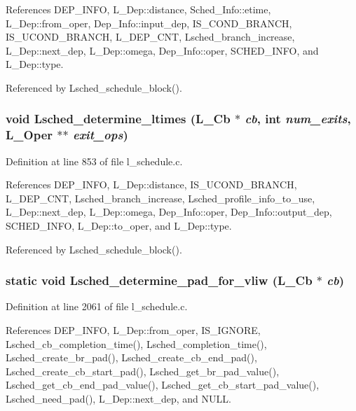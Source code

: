 References DEP\_\-INFO, L\_\-Dep::distance, Sched\_\-Info::etime, L\_\-Dep::from\_\-oper, Dep\_\-Info::input\_\-dep, IS\_\-COND\_\-BRANCH, IS\_\-UCOND\_\-BRANCH, L\_\-DEP\_\-CNT, Lsched\_\-branch\_\-increase, L\_\-Dep::next\_\-dep, L\_\-Dep::omega, Dep\_\-Info::oper, SCHED\_\-INFO, and L\_\-Dep::type.

Referenced by Lsched\_\-schedule\_\-block().
\subsubsection{\setlength{\rightskip}{0pt plus 5cm}void Lsched\_\-determine\_\-ltimes (L\_\-Cb $\ast$ {\em cb}, int {\em num\_\-exits}, L\_\-Oper $\ast$$\ast$ {\em exit\_\-ops})}\label{l__schedule_8c_08a2b260fa792027bc09bbaf9858e331}




Definition at line 853 of file l\_\-schedule.c.

References DEP\_\-INFO, L\_\-Dep::distance, IS\_\-UCOND\_\-BRANCH, L\_\-DEP\_\-CNT, Lsched\_\-branch\_\-increase, Lsched\_\-profile\_\-info\_\-to\_\-use, L\_\-Dep::next\_\-dep, L\_\-Dep::omega, Dep\_\-Info::oper, Dep\_\-Info::output\_\-dep, SCHED\_\-INFO, L\_\-Dep::to\_\-oper, and L\_\-Dep::type.

Referenced by Lsched\_\-schedule\_\-block().
\subsubsection{\setlength{\rightskip}{0pt plus 5cm}static void Lsched\_\-determine\_\-pad\_\-for\_\-vliw (L\_\-Cb $\ast$ {\em cb})\hspace{0.3cm}{\tt  [static]}}\label{l__schedule_8c_7d91b6ba74db4857cb38588bfbfe9c63}




Definition at line 2061 of file l\_\-schedule.c.

References DEP\_\-INFO, L\_\-Dep::from\_\-oper, IS\_\-IGNORE, Lsched\_\-cb\_\-completion\_\-time(), Lsched\_\-completion\_\-time(), Lsched\_\-create\_\-br\_\-pad(), Lsched\_\-create\_\-cb\_\-end\_\-pad(), Lsched\_\-create\_\-cb\_\-start\_\-pad(), Lsched\_\-get\_\-br\_\-pad\_\-value(), Lsched\_\-get\_\-cb\_\-end\_\-pad\_\-value(), Lsched\_\-get\_\-cb\_\-start\_\-pad\_\-value(), Lsched\_\-need\_\-pad(), L\_\-Dep::next\_\-dep, and NULL.

